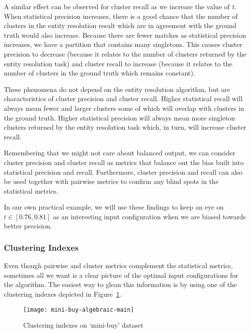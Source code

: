 A similar effect can be observed for cluster recall as we increase the value of
\textit{t}.
When statistical precision increases, there is a good chance that the number of
clusters in the entity resolution result which are in agreement with the ground
truth would also increase.
Because there are fewer matches as statistical precision increases, we have a
partition that contains many singletons.
This causes cluster precision to decrease (because it relates to the number of
clusters returned by the entity resolution task) and cluster recall to increase
(because it relates to the number of clusters in the ground truth which remains
constant).

These phenomena do not depend on the entity resolution algorithm, but are
characteristics of cluster precision and cluster recall.
Higher statistical recall will always mean fewer and larger clusters some of
which will overlap with clusters in the ground truth.
Higher statistical precision will always mean more singleton clusters returned
by the entity resolution task which, in turn, will increase cluster recall.

Remembering that we might not care about balanced output, we can consider
cluster precision and cluster recall as metrics that balance out the bias built
into statistical precision and recall.
Furthermore, cluster precision and recall can also be used together with
pairwise metrics to confirm any blind spots in the statistical metrics.

In our own practical example, we will use these findings to keep an eye on
$t\in\left[0.76,0.81\right]$ as an interesting input configuration when we are
biased towards better precision.

\subsubsection{Clustering Indexes}

Even though pairwise and cluster metrics complement the statistical metrics,
sometimes all we want is a clear picture of the optimal input configurations for
the algorithm.
The easiest way to glean this information is by using one of the clustering
indexes depicted in Figure~\ref{fig:mini-alg}.

\begin{figure}[!h]
    \centering
    \captionsetup{justification=centering}
    \texttt{[image: mini-buy-algebraic-main]}
    \caption{Clustering indexes on `mini-buy' dataset}
    \label{fig:mini-alg}
\end{figure}

